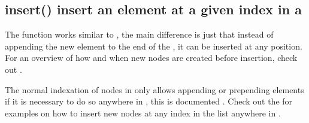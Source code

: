\documentclass[a4paper,10pt,english]{sphinxmanual}
\begin{document}
\subsection{insert() \textendash{} insert an element at a given index in a }
\label{\detokenize{README:insert-insert-an-element-at-a-given-index-in-a-list}}
\sphinxAtStartPar
The  function works similar to {\hyperref[\detokenize{README:append----adding-a-new-element-to-a-list}]{\emph{}}}, the main difference is just that instead of appending the new element to the end of the , it can be inserted at any position. For an overview of how and when new \sphinxhyphen{}nodes are created before insertion, check out {\hyperref[\detokenize{README:append----adding-a-new-element-to-a-list}]{\emph{}}}.

\begin{sphinxVerbatim}[commandchars=\\\{\},numbers=left,firstnumber=1,stepnumber=1]
   \PYG{p}{[}  \PYG{p}{]}
    
\end{sphinxVerbatim}

\sphinxAtStartPar
The normal indexation of \sphinxhyphen{}nodes in  only allows appending or prepending elements if it is necessary to do so anywhere in {\hyperref[\detokenize{README:the-path-parameter}]{\emph{}}}, this is documented {\hyperref[\detokenize{README:correctly-handling-list-indices}]{\emph{}}}. Check out the {\hyperref[\detokenize{README:list_insert}]{\emph{}}}  for examples on how to insert new nodes at any index in the list anywhere in .
\end{document}
